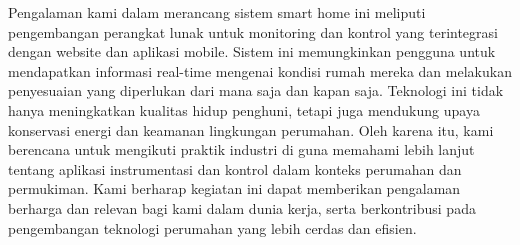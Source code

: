 Pengalaman kami dalam merancang sistem smart home ini meliputi pengembangan perangkat lunak untuk monitoring dan kontrol yang terintegrasi dengan website dan aplikasi mobile. Sistem ini memungkinkan pengguna untuk mendapatkan informasi real-time mengenai kondisi rumah mereka dan melakukan penyesuaian yang diperlukan dari mana saja dan kapan saja. Teknologi ini tidak hanya meningkatkan kualitas hidup penghuni, tetapi juga mendukung upaya konservasi energi dan keamanan lingkungan perumahan. Oleh karena itu, kami berencana untuk mengikuti praktik industri di {\perusahaan} guna memahami lebih lanjut tentang aplikasi instrumentasi dan kontrol dalam konteks perumahan dan permukiman. Kami berharap kegiatan ini dapat memberikan pengalaman berharga dan relevan bagi kami dalam dunia kerja, serta berkontribusi pada pengembangan teknologi perumahan yang lebih cerdas dan efisien.
